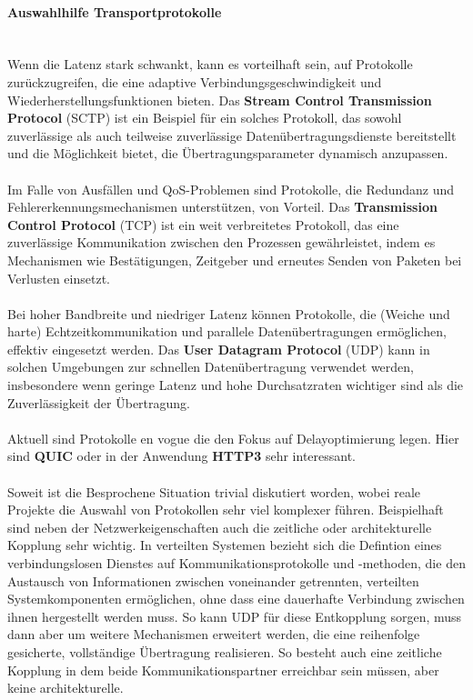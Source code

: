 \documentclass[../vs-script-first-v01.tex]{subfiles}
\begin{document}
\paragraph{Auswahlhilfe Transportprotokolle \\\\}
Wenn die Latenz stark schwankt, kann es vorteilhaft sein, auf Protokolle zurückzugreifen, die eine adaptive Verbindungsgeschwindigkeit und Wiederherstellungsfunktionen bieten. Das \textbf{Stream Control Transmission Protocol} (SCTP) ist ein Beispiel für ein solches Protokoll, das sowohl zuverlässige als auch teilweise zuverlässige Datenübertragungsdienste bereitstellt und die Möglichkeit bietet, die Übertragungsparameter dynamisch anzupassen.
\\\\
Im Falle von Ausfällen und QoS-Problemen sind Protokolle, die Redundanz und Fehlererkennungsmechanismen unterstützen, von Vorteil. Das \textbf{Transmission Control Protocol} (TCP) ist ein weit verbreitetes Protokoll, das eine zuverlässige Kommunikation zwischen den Prozessen gewährleistet, indem es Mechanismen wie Bestätigungen, Zeitgeber und erneutes Senden von Paketen bei Verlusten einsetzt.
\\\\
Bei hoher Bandbreite und niedriger Latenz können Protokolle, die (Weiche und harte) Echtzeitkommunikation und parallele Datenübertragungen ermöglichen, effektiv eingesetzt werden. Das \textbf{User Datagram Protocol} (UDP) kann in solchen Umgebungen zur schnellen Datenübertragung verwendet werden, insbesondere wenn geringe Latenz und hohe Durchsatzraten wichtiger sind als die Zuverlässigkeit der Übertragung.
\\\\
Aktuell sind Protokolle en vogue die den Fokus auf Delayoptimierung legen. Hier sind \textbf{QUIC} oder in der Anwendung \textbf{HTTP3} sehr interessant. 
\\\\
Soweit ist die Besprochene Situation trivial diskutiert worden, wobei  reale Projekte die Auswahl von Protokollen sehr viel komplexer führen. Beispielhaft sind neben der Netzwerkeigenschaften auch die zeitliche oder architekturelle Kopplung sehr wichtig. 
In verteilten Systemen bezieht sich die Defintion eines verbindungslosen Dienstes auf Kommunikationsprotokolle und -methoden, die den Austausch von Informationen zwischen voneinander getrennten, verteilten Systemkomponenten ermöglichen, ohne dass eine dauerhafte Verbindung zwischen ihnen hergestellt werden muss. So kann UDP für diese Entkopplung sorgen, muss dann aber um weitere Mechanismen erweitert werden, die eine reihenfolge gesicherte, vollständige Übertragung realisieren. So besteht auch eine zeitliche Kopplung in dem beide Kommunikationspartner erreichbar sein müssen, aber keine architekturelle. 
\end{document}
